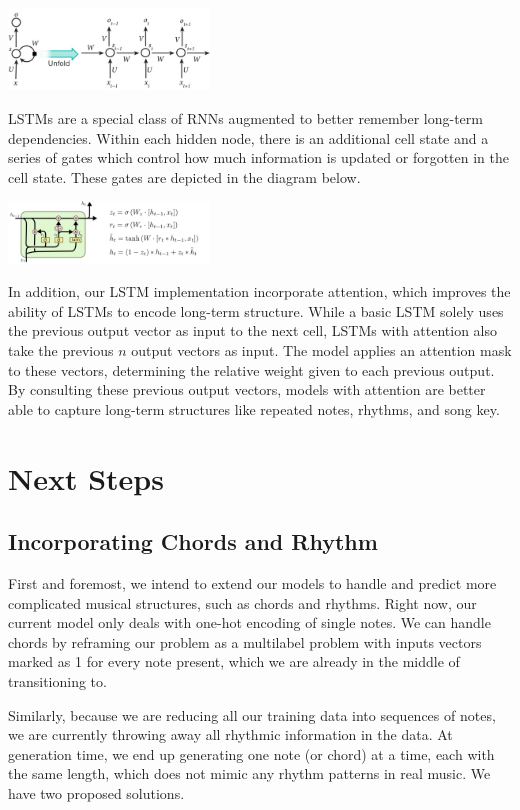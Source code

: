 \documentclass[twoside,twocolumn]{article}
\begin{document}
\includegraphics[width = 0.4\textwidth]{rnn-diagram}

LSTMs are a special class of RNNs augmented to better remember long-term dependencies. Within each hidden node, there is an additional cell state and a series of gates which control how much information is updated or forgotten in the cell state. These gates are depicted in the diagram below.

\includegraphics[width = 0.4\textwidth]{colah-lstm-diagram}

In addition, our LSTM implementation incorporate attention, which improves the ability of LSTMs to encode long-term structure. While a basic LSTM solely uses the previous output vector as input to the next cell, LSTMs with attention also take the previous $n$ output vectors as input. The model applies an attention mask to these vectors, determining the relative weight given to each previous output. By consulting these previous output vectors, models with attention are better able to capture long-term structures like repeated notes, rhythms, and song key.


\section{Next Steps}

\subsection{Incorporating Chords and Rhythm}
First and foremost, we intend to extend our models to handle and predict more complicated musical structures, such as chords and rhythms. Right now, our current model only deals with one-hot encoding of single notes. We can handle chords by reframing our problem as a multilabel problem with inputs vectors marked as 1 for every note present, which we are already in the middle of transitioning to.

Similarly, because we are reducing all our training data into sequences of notes, we are currently throwing away all rhythmic information in the data. At generation time, we end up generating one note (or chord) at a time, each with the same length, which does not mimic any rhythm patterns in real music. We have two proposed solutions.
\end{document}
